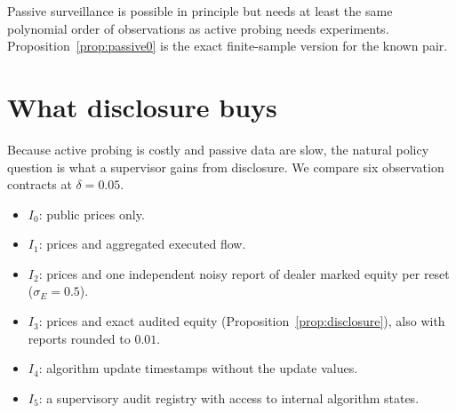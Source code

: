 \documentclass[12pt]{article}
\theoremstyle{definition}
\theoremstyle{remark}
\begin{document}
Passive surveillance is possible in principle but needs at least the same polynomial order of observations as active probing needs experiments. Proposition~\ref{prop:passive0} is the exact finite-sample version for the known pair.

\section{What disclosure buys}\label{sec:disclosure}

Because active probing is costly and passive data are slow, the natural policy question is what a supervisor gains from disclosure. We compare six observation contracts at $\delta=0.05$.
\begin{itemize}[itemsep=1pt]
\item $I_0$: public prices only.
\item $I_1$: prices and aggregated executed flow.
\item $I_2$: prices and one independent noisy report of dealer marked equity per reset ($\sigma_E=0.5$).
\item $I_3$: prices and exact audited equity (Proposition~\ref{prop:disclosure}), also with reports rounded to $0.01$.
\item $I_4$: algorithm update timestamps without the update values.
\item $I_5$: a supervisory audit registry with access to internal algorithm states.
\end{itemize}
\end{document}
